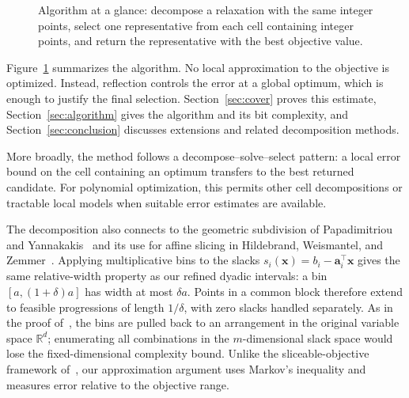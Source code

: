 \documentclass[11pt]{article}
\theoremstyle{definition}\newtheorem{definition}{Definition}[section]
\theoremstyle{remark}\newtheorem{remark}[theorem]{Remark}
\newcommand{\R}{\mathbb R}\newcommand{\Q}{\mathbb Q}\newcommand{\Z}{\mathbb Z}
\begin{document}
\begin{figure}[htbp]
\centering
{}
\caption{Algorithm at a glance: decompose a relaxation with the same integer points, select one representative from each cell containing integer points, and return the representative with the best objective value.}\label{fig:overview}
\end{figure}

Figure~\ref{fig:overview} summarizes the algorithm. No local approximation to the objective is optimized. Instead, reflection controls the error at a global optimum, which is enough to justify the final selection. Section~\ref{sec:cover} proves this estimate, Section~\ref{sec:algorithm} gives the algorithm and its bit complexity, and Section~\ref{sec:conclusion} discusses extensions and related decomposition methods.

More broadly, the method follows a decompose--solve--select pattern: a local error bound on the cell containing an optimum transfers to the best returned candidate. For polynomial optimization, this permits other cell decompositions or tractable local models when suitable error estimates are available.

The decomposition also connects to the geometric subdivision of Papadimitriou and Yannakakis~\cite{PY} and its use for affine slicing in Hildebrand, Weismantel, and Zemmer~\cite[Section~2]{HWZ}. Applying multiplicative bins to the slacks $s_i(\mathbf{x})=b_i-\mathbf a_i^\top\mathbf{x}$ gives the same relative-width property as our refined dyadic intervals: a bin $[a,(1+\delta)a]$ has width at most $\delta a$. Points in a common block therefore extend to feasible progressions of length $1/\delta$, with zero slacks handled separately. As in the proof of~\cite[Theorem~2.1]{HWZ}, the bins are pulled back to an arrangement in the original variable space $\R^d$; enumerating all combinations in the $m$-dimensional slack space would lose the fixed-dimensional complexity bound. Unlike the sliceable-objective framework of~\cite{HWZ}, our approximation argument uses Markov's inequality and measures error relative to the objective range.
\end{document}
